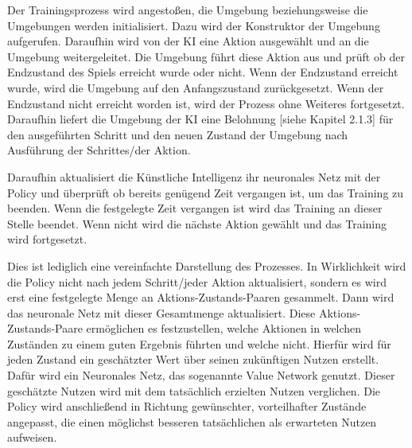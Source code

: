 Der Trainingsprozess wird angestoßen, die Umgebung beziehungsweise die Umgebungen werden initialisiert. Dazu wird der Konstruktor der Umgebung aufgerufen. Daraufhin wird von der KI eine Aktion ausgewählt und an die Umgebung weitergeleitet. Die Umgebung führt diese Aktion aus und prüft ob der Endzustand des Spiels erreicht wurde oder nicht. Wenn der Endzustand erreicht wurde, wird die Umgebung auf den Anfangszustand zurückgesetzt. Wenn der Endzustand nicht erreicht worden ist, wird der Prozess ohne Weiteres fortgesetzt. Daraufhin liefert die Umgebung der KI eine Belohnung [siehe Kapitel 2.1.3] für den ausgeführten Schritt und den neuen Zustand der Umgebung nach Ausführung der Schrittes/der Aktion.

Daraufhin aktualisiert die Künstliche Intelligenz ihr neuronales Netz mit der Policy und überprüft ob bereits genügend Zeit vergangen ist, um das Training zu beenden. Wenn die festgelegte Zeit vergangen ist wird das Training an dieser Stelle beendet. Wenn nicht wird die nächste Aktion gewählt und das Training wird fortgesetzt.

Dies ist lediglich eine vereinfachte Darstellung des Prozesses. In Wirklichkeit wird die Policy nicht nach jedem Schritt/jeder Aktion aktualisiert, sondern es wird erst eine festgelegte Menge an Aktions-Zustands-Paaren gesammelt. Dann wird das neuronale Netz mit dieser Gesamtmenge aktualisiert. Diese Aktions-Zustands-Paare ermöglichen es festzustellen, welche Aktionen in welchen Zuständen zu einem guten Ergebnis führten und welche nicht. Hierfür wird für jeden Zustand ein geschätzter Wert über seinen zukünftigen Nutzen erstellt. Dafür wird ein Neuronales Netz, das sogenannte Value Network genutzt. Dieser geschätzte Nutzen wird mit dem tatsächlich erzielten Nutzen verglichen. Die Policy wird anschließend in Richtung gewünschter, vorteilhafter Zustände angepasst, die einen möglichst besseren tatsächlichen als erwarteten Nutzen aufweisen.
